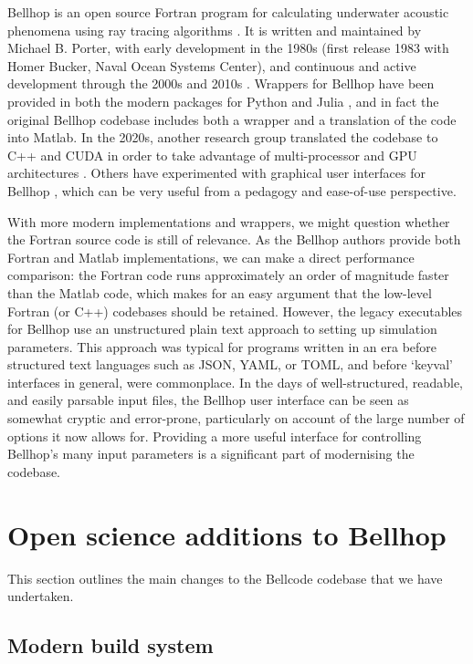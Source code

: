 \documentclass[twocolumn]{willarticle}
\begin{document}
Bellhop is an open source Fortran program for calculating underwater acoustic phenomena using ray tracing algorithms \parencite{porter2025-foa}.
It is written and maintained by Michael B. Porter, with early development in the 1980s (first release 1983 with Homer Bucker, Naval Ocean Systems Center), and continuous and active development through the 2000s and 2010s \parencite{porter2024-at}.
Wrappers for Bellhop have been provided in both the modern packages for Python \parencite{chitre2025-arlpy} and Julia \parencite{chitre2025-jl}, and in fact the original Bellhop codebase includes both a wrapper and a translation of the code into Matlab.
In the 2020s, another research group translated the codebase to C++ and CUDA in order to take advantage of multi-processor and GPU architectures \parencite{jaffe2025-bellhopcuda}.
Others have experimented with graphical user interfaces for Bellhop \parencite{duncan2025-actup}, which can be very useful from a pedagogy and ease-of-use perspective.

With more modern implementations and wrappers, we might question whether the Fortran source code is still of relevance.
As the Bellhop authors provide both Fortran and Matlab implementations, we can make a direct performance comparison: the Fortran code runs approximately an order of magnitude faster than the Matlab code, which makes for an easy argument that the low-level Fortran (or C++) codebases should be retained.
However, the legacy executables for Bellhop use an unstructured plain text approach to setting up simulation parameters.
This approach was typical for programs written in an era before structured text languages such as JSON, YAML, or TOML, and before `keyval' interfaces in general, were commonplace.
In the days of well-structured, readable, and easily parsable input files, the Bellhop user interface can be seen as somewhat cryptic and error-prone, particularly on account of the large number of options it now allows for.
Providing a more useful interface for controlling Bellhop's many input parameters is a significant part of modernising the codebase.

\section{Open science additions to Bellhop}

This section outlines the main changes to the Bellcode codebase that we have undertaken.

\subsection{Modern build system}
\end{document}
